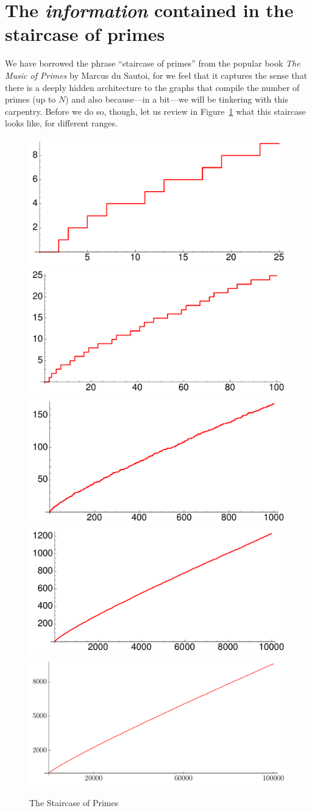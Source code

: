 \documentclass[11pt]{article}
\theoremstyle{plain}
\theoremstyle{definition}
\numberwithin{equation}{section}
\numberwithin{figure}{section}
\numberwithin{table}{section}
\begin{document}
\section{The {\em information} contained in the staircase of primes}
 
\bigskip

We have borrowed the phrase ``staircase of primes'' from the popular
book {\em The Music of Primes} by Marcus du Sautoi, for we feel that
it captures the sense that there is a deeply hidden architecture to
the graphs that compile the number of primes (up to $N$) and also
because---in a bit---we will be tinkering with this carpentry.  Before
we do so, though, let us review in Figure~\ref{fig:staircases}
what this staircase looks like, for
different ranges.

\begin{figure}[H]
\begin{center}
\includegraphics[width=.4\textwidth]{illustrations/PN_25} 
\includegraphics[width=.4\textwidth]{illustrations/PN_100}\\ 

\includegraphics[width=.4\textwidth]{illustrations/PN_1000}
\includegraphics[width=.4\textwidth]{illustrations/PN_10000}\\ 

\includegraphics[width=.6\textwidth]{illustrations/PN_100000}
\end{center}
\caption{The Staircase of Primes\label{fig:staircases}}
\end{figure}
\end{document}

